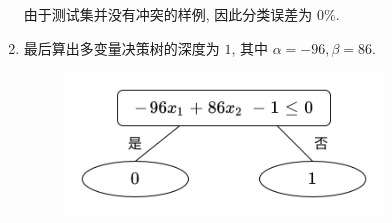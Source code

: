 \documentclass[answers]{exam}  %
\begin{document}
\begin{questions}
\begin{solution}
\begin{enumerate}
            由于测试集并没有冲突的样例, 因此分类误差为 $0\%$.

      \item

            最后算出多变量决策树的深度为 $1$, 其中 $\alpha=-96, \beta=86$.

            \begin{figure}[H]
              \centering
              \includegraphics[width=0.8\textwidth]{./figure/PS3-5-3.png}
              \label{Fig.main1}
            \end{figure}
    \end{enumerate}

  \end{solution}

\end{questions}
\end{document}
